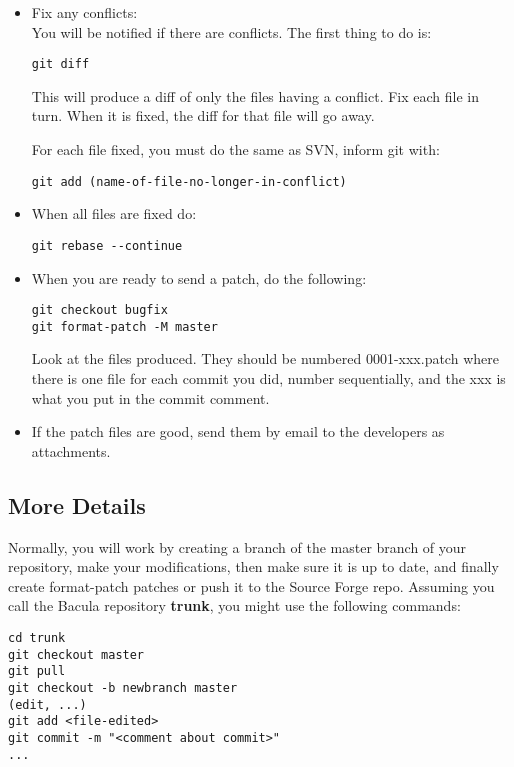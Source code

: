 \begin{itemize}
\item Fix any conflicts:\\
You will be notified if there are conflicts. The first
thing to do is:

\begin{verbatim}
git diff
\end{verbatim}

This will produce a diff of only the files having a conflict.
Fix each file in turn. When it is fixed, the diff for that file
will go away. 

For each file fixed, you must do the same as SVN, inform git with:

\begin{verbatim}
git add (name-of-file-no-longer-in-conflict)
\end{verbatim}

\item When all files are fixed do:
\begin{verbatim}
git rebase --continue
\end{verbatim}

\item When you are ready to send a patch, do the following:\\
\begin{verbatim}
git checkout bugfix
git format-patch -M master
\end{verbatim}
Look at the files produced.  They should be numbered 0001-xxx.patch
where there is one file for each commit you did, number sequentially,
and the xxx is what you put in the commit comment.

\item If the patch files are good, send them by email to the developers
as attachments.

\end{itemize}



\subsection{More Details}

Normally, you will work by creating a branch of the master branch of your
repository, make your modifications, then make sure it is up to date, and finally
create format-patch patches or push it to the Source Forge repo. Assuming
you call the Bacula repository {\bf trunk}, you might use the following
commands:

\begin{verbatim}
cd trunk
git checkout master
git pull 
git checkout -b newbranch master
(edit, ...)
git add <file-edited>
git commit -m "<comment about commit>"
...
\end{verbatim}

